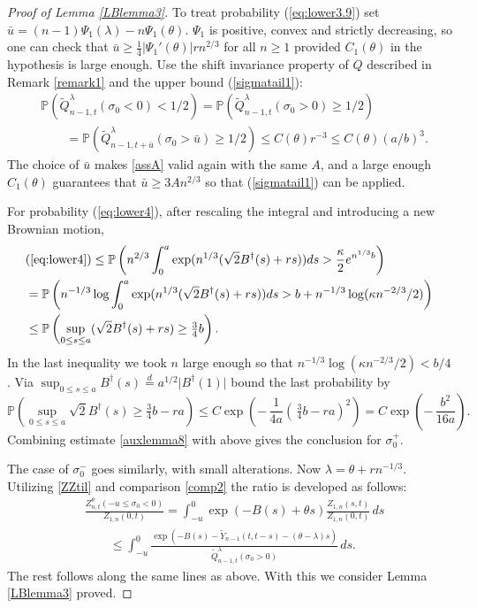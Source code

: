 \documentclass[11pt]{amsart}
\numberwithin{equation}{section}
\theoremstyle{remark}
\providecommand{\abs}[1]{\vert#1\vert}
\begin{document}
\begin{proof}[Proof of Lemma \ref{LBlemma3}]
To treat probability (\ref{eq:lower3.9}) set 
$\bar u=  (n-1){\Psi_1}(\lambda)-n{\Psi_1}({\theta})$.  
${\Psi_1}$ is positive, convex and strictly decreasing, so one can check that 
 $\bar u \ge\tfrac14 \abs{{\Psi_1}'({\theta})} r n^{2/3}$ for  all $n\ge 1$ provided $C_1({\theta})$ in the hypothesis
is large enough.   Use the shift 
invariance property of $Q$ described in Remark \ref{remark1} and the upper bound (\ref{sigmatail1}):
\begin{equation}\begin{aligned}
&{\mathbb{P}}(\tilde Q^{\lambda}_{n-1,t}(\sigma_0<0)<1/2)={\mathbb{P}}(\tilde Q^{\lambda}_{n-1,t}(\sigma_0>0)\ge1/2)\\
&\qquad =
{\mathbb{P}}(\tilde Q^{\lambda}_{n-1,t+\bar u}(\sigma_0>\bar u)\ge1/2) \le C({\theta}) r^{-3}
\le C({\theta})(a/b)^3. 
 \end{aligned}\label{auxlemma8}\end{equation}
The choice of $\bar u$ makes \eqref{assA} valid again with the same $A$, and  
a large enough $C_1({\theta})$  guarantees that $\bar u\ge 3An^{2/3}$ so that 
(\ref{sigmatail1}) can be applied.  
 
For probability (\ref{eq:lower4}), after rescaling the integral and introducing a new Brownian motion, 
\begin{align*}
&\text{(\ref{eq:lower4})}  \le {\mathbb{P}}\left(n^{2/3}\int_0^{a} \exp(n^{1/3}(\sqrt{2}B^{\dagger}(s)+r  s))  ds>\frac{\kappa}2  e^{n^{1/3}  {b}}\right)\\   
&  ={\mathbb{P}}\left(n^{-1/3}\log\int_0^{a} \exp(n^{1/3}(\sqrt{2}B^{\dagger}(s)+r  s))  ds> {b} +n^{-1/3} \log( \kappa n^{-2/3}/2)\right)\\  
&\le  
{\mathbb{P}}\left(\sup_{0\le s\le {a}}(
\sqrt{2} B^{\dagger}(s)+r   s) \ge \tfrac34{b}
\right).
\end{align*}
In the last inequality we took $n$ large enough so that $n^{-1/3} \log( \kappa n^{-2/3}/2)< b/4$.
Via $\sup_{0\le s\le {a}}
 B^{\dagger}(s){\stackrel{d}{=}} {a}^{1/2} \abs{B^{\dagger}(1)}$  bound the last probability by
\[
{\mathbb{P}}\left(\sup_{0\le s\le {a}}
\sqrt{2} B^{\dagger}(s)\ge \tfrac34b-r  {a}
\right)\le C\exp\left( -\,\frac1{4{a}}{( \,\tfrac34b-r  {a})^2}\right)
=C\exp\left(-\,\frac{b^2}{16{a}}\right). 
\]
Combining estimate \eqref{auxlemma8} with above gives the conclusion for $\sigma^+_0$.  

The case of $\sigma^-_0$ goes similarly, with small alterations.
Now $\lambda={\theta}+rn^{-1/3}$.  Utilizing 
\eqref{ZZtil} and comparison \eqref{comp2}
the ratio is  developed as follows:
\begin{align*}
&\frac{Z^{\theta}_{n,t}( -u\le  \sigma_0<0)}{Z_{1,n}(0,t)} 
=
 \int_{-u}^0 \exp(-B(s)+{\theta} s) \frac{Z_{1,n}(s,t)}{Z_{1,n}(0,t)}\, ds\\
 &\qquad \le  \int_{-u}^0 \frac{ \exp(-B(s)-\tilde Y_{n-1}(t,t-s)-({\theta}-\lambda) s)  }{\tilde Q^{\lambda}_{n-1,t}(\sigma_0>0)}\,ds.
\end{align*}
The rest follows along the same lines as above. With this we consider
Lemma \ref{LBlemma3}   proved.  
\end{proof}
\end{document}
